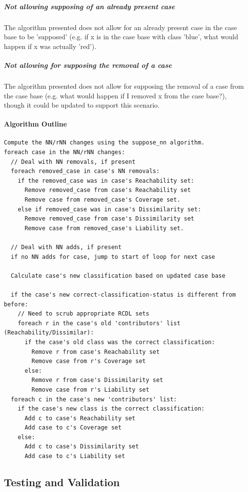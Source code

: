 \documentclass[a4paper,11pt]{report}
\begin{document}
\subparagraph{Not allowing supposing of an already present case}
The algorithm presented does not allow for an already present case in the case base to be 'supposed' (e.g. if x is in the case base with class 'blue', what would happen if x was actually 'red').

\subparagraph{Not allowing for supposing the removal of a case}
The algorithm presented does not allow for supposing the removal of a case from the case base (e.g. what would happen if I removed x from the case base?), though it could be updated to support this scenario.
 
\paragraph{Algorithm Outline}
\begin{verbatim}
Compute the NN/rNN changes using the suppose_nn algorithm.
foreach case in the NN/rNN changes:
  // Deal with NN removals, if present
  foreach removed_case in case's NN removals:
    if the removed_case was in case's Reachability set:
      Remove removed_case from case's Reachability set
      Remove case from removed_case's Coverage set.
    else if removed_case was in case's Dissimilarity set:
      Remove removed_case from case's Dissimilarity set
      Remove case from removed_case's Liability set.

  // Deal with NN adds, if present
  if no NN adds for case, jump to start of loop for next case

  Calculate case's new classification based on updated case base
  
  if the case's new correct-classification-status is different from before:
    // Need to scrub appropriate RCDL sets
    foreach r in the case's old 'contributors' list (Reachability/Dissimilar):
      if the case's old class was the correct classification:
        Remove r from case's Reachability set
        Remove case from r's Coverage set
      else:
        Remove r from case's Dissimilarity set
        Remove case from r's Liability set
  foreach c in the case's new 'contributors' list:
    if the case's new class is the correct classification:
      Add c to case's Reachability set
      Add case to c's Coverage set
    else:
      Add c to case's Dissimilarity set
      Add case to c's Liability set

\end{verbatim}

\subsection{Testing and Validation}
\end{document}

